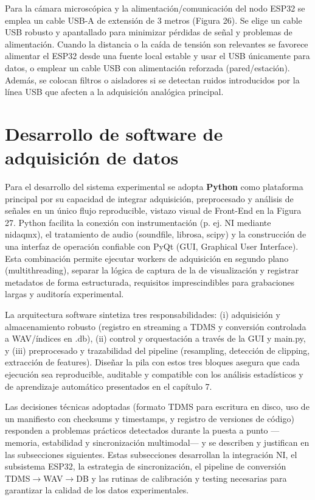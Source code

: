 \documentclass[12pt, letterpaper]{report}
\begin{document}
Para la cámara microscópica y la alimentación/comunicación del nodo ESP32 se emplea un cable USB-A de extensión de 3 metros (Figura 26). Se elige un cable USB robusto y apantallado para minimizar pérdidas de señal y problemas de alimentación. Cuando la distancia o la caída de tensión son relevantes se favorece alimentar el ESP32 desde una fuente local estable y usar el USB únicamente para datos, o emplear un cable USB con alimentación reforzada (pared/estación). Además, se colocan filtros o aisladores si se detectan ruidos introducidos por la línea USB que afecten a la adquisición analógica principal.


\section{Desarrollo de software de adquisición de datos}

Para el desarrollo del sistema experimental se adopta \textbf{Python} como plataforma principal por su capacidad de integrar adquisición, preprocesado y análisis de señales en un único flujo reproducible, vistazo visual de Front-End en la Figura 27. Python facilita la conexión con instrumentación (p. ej. NI mediante nidaqmx), el tratamiento de audio (soundfile, librosa, scipy) y la construcción de una interfaz de operación confiable con PyQt (GUI,  Graphical User Interface). Esta combinación permite ejecutar workers de adquisición en segundo plano (multithreading), separar la lógica de captura de la de visualización y registrar metadatos de forma estructurada, requisitos imprescindibles para grabaciones largas y auditoría experimental.


La arquitectura software sintetiza tres responsabilidades: (i) adquisición y almacenamiento robusto (registro en streaming a TDMS y conversión controlada a WAV/índices en .db), (ii) control y orquestación a través de la GUI y main.py, y (iii) preprocesado y trazabilidad del pipeline (resampling, detección de clipping, extracción de features). Diseñar la pila con estos tres bloques asegura que cada ejecución sea reproducible, auditable y compatible con los análisis estadísticos y de aprendizaje automático presentados en el capítulo 7.

Las decisiones técnicas adoptadas (formato TDMS para escritura en disco, uso de un manifiesto con checksums y timestamps, y registro de versiones de código) responden a problemas prácticos detectados durante la puesta a punto ---memoria, estabilidad y sincronización multimodal--- y se describen y justifican en las subsecciones siguientes. Estas subsecciones desarrollan la integración NI, el subsistema ESP32, la estrategia de sincronización, el pipeline de conversión TDMS$\rightarrow$WAV$\rightarrow$DB y las rutinas de calibración y testing necesarias para garantizar la calidad de los datos experimentales.
\end{document}
